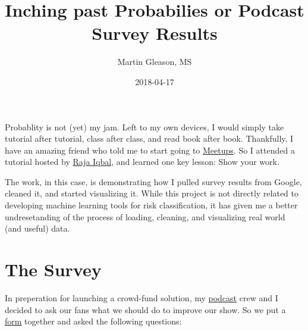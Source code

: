 \documentclass[]{article}
\title{Inching past Probabilies or Podcast Survey Results}
\author{Martin Gleason, MS}
\date{2018-04-17}
\begin{document}
\maketitle

Probablity is not (yet) my jam. Left to my own devices, I would simply
take tutorial after tutorial, class after class, and read book after
book. Thankfully, I have an amazing friend who told me to start going to
\href{https://www.meetup.com/data-science-dojo-chicago/events/247965706/}{Meetups}.
So I attended a tutorial hosted by
\href{https://datasciencedojo.com}{Raja Iqbal}, and learned one key
lesson: Show your work.

The work, in this case, is demonstrating how I pulled survey results
from Google, cleaned it, and started visualizing it. While this project
is not directly related to developing machine learning tools for risk
classification, it has given me a better undresetanding of the process
of loading, cleaning, and visualizing real world (and useful) data.

\section{The Survey}\label{the-survey}

In preperation for launching a crowd-fund solution, my
\href{https://allcomicsconsidered.com}{podcast} crew and I decided to
ask our fans what we should do to improve our show. So we put a
\href{https://goo.gl/forms/LXkXXiJMvdSi0fpl2}{form} together and asked
the following questions:
\end{document}
